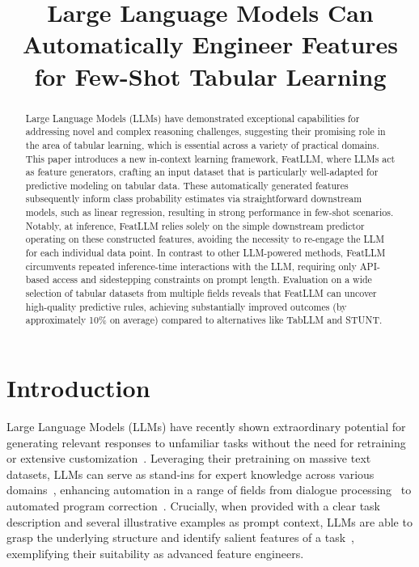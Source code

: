 \title{Large Language Models Can Automatically Engineer Features for Few-Shot Tabular Learning}

\begin{abstract}
Large Language Models (LLMs) have demonstrated exceptional capabilities for addressing novel and complex reasoning challenges, suggesting their promising role in the area of tabular learning, which is essential across a variety of practical domains. This paper introduces a new in-context learning framework, \textsf{FeatLLM}, where LLMs act as feature generators, crafting an input dataset that is particularly well-adapted for predictive modeling on tabular data. These automatically generated features subsequently inform class probability estimates via straightforward downstream models, such as linear regression, resulting in strong performance in few-shot scenarios. Notably, at inference, \textsf{FeatLLM} relies solely on the simple downstream predictor operating on these constructed features, avoiding the necessity to re-engage the LLM for each individual data point. In contrast to other LLM-powered methods, \textsf{FeatLLM} circumvents repeated inference-time interactions with the LLM, requiring only API-based access and sidestepping constraints on prompt length. Evaluation on a wide selection of tabular datasets from multiple fields reveals that \textsf{FeatLLM} can uncover high-quality predictive rules, achieving substantially improved outcomes (by approximately 10\% on average) compared to alternatives like TabLLM and STUNT.
\end{abstract}

\section{Introduction}
Large Language Models (LLMs) have recently shown extraordinary potential for generating relevant responses to unfamiliar tasks without the need for retraining or extensive customization~\cite{creswell2022selection,imani2023mathprompter,taylor2022galactica}. Leveraging their pretraining on massive text datasets, LLMs can serve as stand-ins for expert knowledge across various domains~\cite{Genomes2021,singhal2023large,wilcox2003role}, enhancing automation in a range of fields from dialogue processing~\cite{finch2023leveraging} to automated program correction~\cite{fan2023automated}. Crucially, when provided with a clear task description and several illustrative examples as prompt context, LLMs are able to grasp the underlying structure and identify salient features of a task~\cite{brown2020language,zhao2023survey}, exemplifying their suitability as advanced feature engineers.

